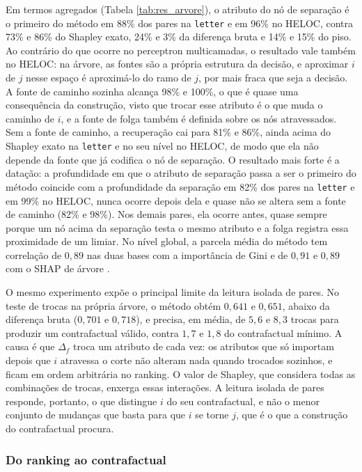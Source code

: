 Em termos agregados (Tabela \ref{tab:res_arvore}), o atributo do nó de separação é o primeiro do método em 88\% dos pares na \texttt{letter} e em 96\% no HELOC, contra 73\% e 86\% do Shapley exato, 24\% e 3\% da diferença bruta e 14\% e 15\% do piso. Ao contrário do que ocorre no perceptron multicamadas, o resultado vale também no HELOC: na árvore, as fontes são a própria estrutura da decisão, e aproximar $i$ de $j$ nesse espaço é aproximá-lo do ramo de $j$, por mais fraca que seja a decisão. A fonte de caminho sozinha alcança 98\% e 100\%, o que é quase uma consequência da construção, visto que trocar esse atributo é o que muda o caminho de $i$, e a fonte de folga também é definida sobre os nós atravessados. Sem a fonte de caminho, a recuperação cai para 81\% e 86\%, ainda acima do Shapley exato na \texttt{letter} e no seu nível no HELOC, de modo que ela não depende da fonte que já codifica o nó de separação. O resultado mais forte é a datação: a profundidade em que o atributo de separação passa a ser o primeiro do método coincide com a profundidade da separação em 82\% dos pares na \texttt{letter} e em 99\% no HELOC, nunca ocorre depois dela e quase não se altera sem a fonte de caminho (82\% e 98\%). Nos demais pares, ela ocorre antes, quase sempre porque um nó acima da separação testa o mesmo atributo e a folga registra essa proximidade de um limiar. No nível global, a parcela média do método tem correlação de $0{,}89$ nas duas bases com a importância de Gini e de $0{,}91$ e $0{,}89$ com o SHAP de árvore \citep{Lundberg2020}.

O mesmo experimento expõe o principal limite da leitura isolada de pares. No teste de trocas na própria árvore, o método obtém $0{,}641$ e $0{,}651$, abaixo da diferença bruta ($0{,}701$ e $0{,}718$), e precisa, em média, de $5{,}6$ e $8{,}3$ trocas para produzir um contrafactual válido, contra $1{,}7$ e $1{,}8$ do contrafactual mínimo. A causa é que $\Delta_f$ troca um atributo de cada vez: os atributos que só importam depois que $i$ atravessa o corte não alteram nada quando trocados sozinhos, e ficam em ordem arbitrária no ranking. O valor de Shapley, que considera todas as combinações de trocas, enxerga essas interações. A leitura isolada de pares responde, portanto, o que distingue $i$ do seu contrafactual, e não o menor conjunto de mudanças que basta para que $i$ se torne $j$, que é o que a construção do contrafactual procura.

\subsubsection*{Do ranking ao contrafactual}

